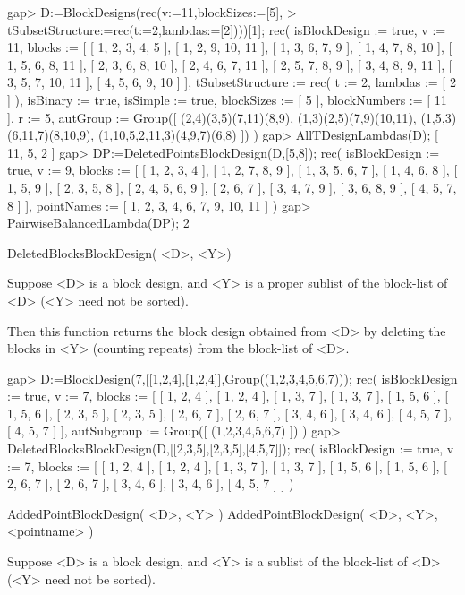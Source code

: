 \beginexample
gap> D:=BlockDesigns(rec(v:=11,blockSizes:=[5],
>       tSubsetStructure:=rec(t:=2,lambdas:=[2])))[1];
rec( isBlockDesign := true, v := 11, 
  blocks := [ [ 1, 2, 3, 4, 5 ], [ 1, 2, 9, 10, 11 ], [ 1, 3, 6, 7, 9 ], 
      [ 1, 4, 7, 8, 10 ], [ 1, 5, 6, 8, 11 ], [ 2, 3, 6, 8, 10 ], 
      [ 2, 4, 6, 7, 11 ], [ 2, 5, 7, 8, 9 ], [ 3, 4, 8, 9, 11 ], 
      [ 3, 5, 7, 10, 11 ], [ 4, 5, 6, 9, 10 ] ], 
  tSubsetStructure := rec( t := 2, lambdas := [ 2 ] ), isBinary := true, 
  isSimple := true, blockSizes := [ 5 ], blockNumbers := [ 11 ], r := 5, 
  autGroup := Group([ (2,4)(3,5)(7,11)(8,9), (1,3)(2,5)(7,9)(10,11), 
      (1,5,3)(6,11,7)(8,10,9), (1,10,5,2,11,3)(4,9,7)(6,8) ]) )
gap> AllTDesignLambdas(D);      
[ 11, 5, 2 ]
gap> DP:=DeletedPointsBlockDesign(D,[5,8]);
rec( isBlockDesign := true, v := 9, 
  blocks := [ [ 1, 2, 3, 4 ], [ 1, 2, 7, 8, 9 ], [ 1, 3, 5, 6, 7 ], 
      [ 1, 4, 6, 8 ], [ 1, 5, 9 ], [ 2, 3, 5, 8 ], [ 2, 4, 5, 6, 9 ], 
      [ 2, 6, 7 ], [ 3, 4, 7, 9 ], [ 3, 6, 8, 9 ], [ 4, 5, 7, 8 ] ], 
  pointNames := [ 1, 2, 3, 4, 6, 7, 9, 10, 11 ] )
gap> PairwiseBalancedLambda(DP);
2
\endexample



\>DeletedBlocksBlockDesign( <D>, <Y>)

Suppose <D> is a block design, and <Y> is a proper sublist of the 
block-list of <D> (<Y> need not be sorted).
 
Then this function returns the block design obtained from <D> by deleting
the blocks in <Y> (counting repeats) from the block-list of <D>.

\beginexample
gap> D:=BlockDesign(7,[[1,2,4],[1,2,4]],Group((1,2,3,4,5,6,7)));
rec( isBlockDesign := true, v := 7, 
  blocks := [ [ 1, 2, 4 ], [ 1, 2, 4 ], [ 1, 3, 7 ], [ 1, 3, 7 ], 
      [ 1, 5, 6 ], [ 1, 5, 6 ], [ 2, 3, 5 ], [ 2, 3, 5 ], [ 2, 6, 7 ], 
      [ 2, 6, 7 ], [ 3, 4, 6 ], [ 3, 4, 6 ], [ 4, 5, 7 ], [ 4, 5, 7 ] ], 
  autSubgroup := Group([ (1,2,3,4,5,6,7) ]) )
gap> DeletedBlocksBlockDesign(D,[[2,3,5],[2,3,5],[4,5,7]]);
rec( isBlockDesign := true, v := 7, 
  blocks := [ [ 1, 2, 4 ], [ 1, 2, 4 ], [ 1, 3, 7 ], [ 1, 3, 7 ], 
      [ 1, 5, 6 ], [ 1, 5, 6 ], [ 2, 6, 7 ], [ 2, 6, 7 ], [ 3, 4, 6 ], 
      [ 3, 4, 6 ], [ 4, 5, 7 ] ] )
\endexample



\>AddedPointBlockDesign( <D>, <Y> )
\>AddedPointBlockDesign( <D>, <Y>, <pointname> )

Suppose <D> is a block design, and <Y> is a sublist of the block-list
of <D> (<Y> need not be sorted).

